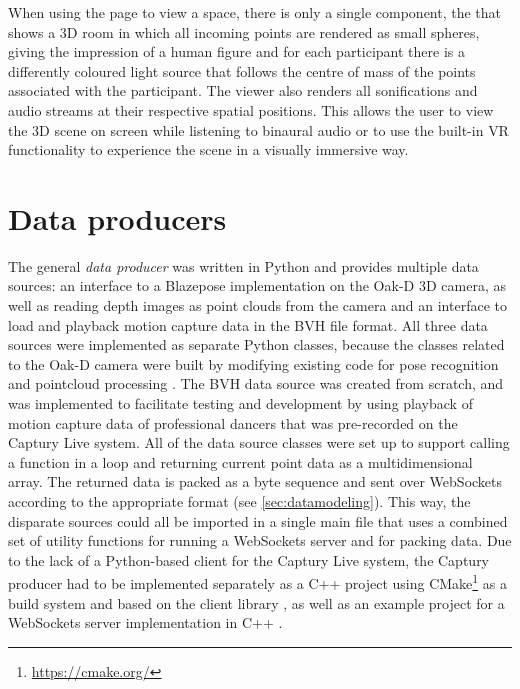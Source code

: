 When using the page to view a space, there is only a single component, the  that shows a \ac{3D} room in which all incoming points are rendered as small spheres, giving the impression of a human figure and for each participant there is a differently coloured light source that follows the centre of mass of the points associated with the participant.
The viewer also renders all sonifications and audio streams at their respective spatial positions.
This allows the user to view the \ac{3D} scene on screen while listening to binaural audio or to use the built-in \ac{VR} functionality to experience the scene in a visually immersive way.

\section{Data producers}

The general \emph{data producer} was written in Python and provides multiple data sources: an interface to a Blazepose implementation on the Oak-D \ac{3D} camera, as well as reading depth images as point clouds from the camera and an interface to load and playback motion capture data in the \ac{BVH} file format.
All three data sources were implemented as separate Python classes, because the classes related to the Oak-D camera were built by modifying existing code for pose recognition \parencite{githubDepthAiBlazePose} and pointcloud processing \parencite{githubDepthAiPointcloud}.
The \ac{BVH} data source was created from scratch, and was implemented to facilitate testing and development by using playback of motion capture data of professional dancers that was pre-recorded on the Captury Live system.
All of the data source classes were set up to support calling a function in a loop and returning current point data as a multidimensional array.
The returned data is packed as a byte sequence and sent over WebSockets according to the appropriate format (see \autoref{sec:datamodeling}).
This way, the disparate sources could all be imported in a single main file that uses a combined set of utility functions for running a WebSockets server and for packing data.
Due to the lack of a Python-based client for the Captury Live system, the Captury producer had to be implemented separately as a C++ project using CMake\footnote{\url{https://cmake.org/}} as a build system and based on the  client library \parencite{githubRemoteCaptury}, as well as an example project for a WebSockets server implementation in C++ \parencite{githubCppWebSocketsDemo}.

